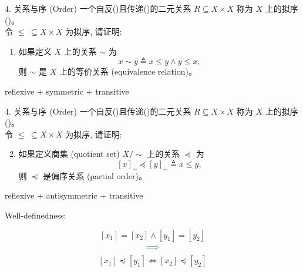 \begin{frame}{}
  \begin{exampleblock}{$4.$ 关系与序 (Order)}
    一个自反()且传递()的二元关系 $R \subseteq X \times X$ 
    称为 $X$ 上的拟序 ()。\\[8pt]

    令 $\le \;\subseteq X \times X$ 为拟序, 请证明:
    \begin{enumerate}[(1)]
      \item 如果定义 $X$ 上的关系 $\sim$ 为
	\[
	  x \sim y \triangleq x \le y \land y \le x,
	\]
	则 $\sim$ 是 $X$ 上的等价关系 (equivalence relation)。
    \end{enumerate}
  \end{exampleblock}

  \pause
  \vspace{0.50cm}
  \centerline{reflexive + symmetric + transitive}
\end{frame}

\begin{frame}{}
  \begin{exampleblock}{$4.$ 关系与序 (Order)}
    一个自反()且传递()的二元关系 $R \subseteq X \times X$ 
    称为 $X$ 上的拟序 ()。\\[8pt]

    令 $\le \;\subseteq X \times X$ 为拟序, 请证明:
    \begin{enumerate}[(1)]
      \setcounter{enumi}{1}
      \item 如果定义商集 (quotient set) $X/\sim$ 上的关系 $\preceq$ 为
	\[
	  [x]_{\sim} \preceq [y]_{\sim} \triangleq x \le y,
	\]
	则 $\preceq$ 是偏序关系 (partial order)。
    \end{enumerate}
  \end{exampleblock}

  \pause
  \vspace{0.30cm}
  \centerline{reflexive + antisymmetric + transitive}

  \pause
  \vspace{0.60cm}
  \centerline{}
\end{frame}

\begin{frame}{}
  \centerline{\large Well-definedness: }

  \pause
  \vspace{0.50cm}
  \[
    [x_1] = [x_2] \land [y_1] = [y_2]
  \]
  \[
    \textcolor{teal}{\implies}
  \]
  \[
    [x_1] \preceq [y_1] \iff [x_2] \preceq [y_2]
  \]
\end{frame}

